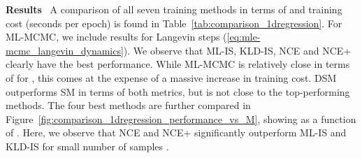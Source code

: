 \documentclass{bmvc2k}
\newcommand{\parsection}[1]{\vspace{2mm}\noindent\textbf{#1}~ }
\begin{document}
\parsection{Results}
A comparison of all seven training methods in terms of  and training cost (seconds per epoch) is found in Table~\ref{tab:comparison_1dregression}. For ML-MCMC, we include results for  Langevin steps (\ref{eq:mle-mcmc_langevin_dynamics}). We observe that ML-IS, KLD-IS, NCE and NCE+ clearly have the best performance. While ML-MCMC is relatively close in terms of  for , this comes at the expense of a massive increase in training cost. DSM outperforms SM in terms of both metrics, but is not close to the top-performing methods. The four best methods are further compared in Figure~\ref{fig:comparison_1dregression_performance_vs_M}, showing  as a function of . Here, we observe that NCE and NCE+ significantly outperform ML-IS and KLD-IS for small number of samples .

\begin{table}[t]
\centering
	\vspace{-3.5mm}
	\caption{Comparison of training methods for the illustrative 1D regression experiments.}\vspace{-1.5mm}
	\label{tab:comparison_1dregression}
\end{table} 
\end{document}
